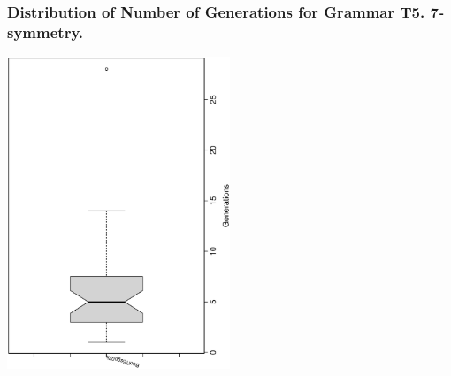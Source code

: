  \begin{frame}
 \frametitle{ Distribution of Number of Generations for Grammar T5. 7-symmetry. }
 \begin{center}
\includegraphics[width=0.5\textwidth, angle=-90]
{ExpFboxplottGenerations005.eps}
 \end{center}
 \label{ExpFboxplottGenerations005.eps}  
 \end{frame}

